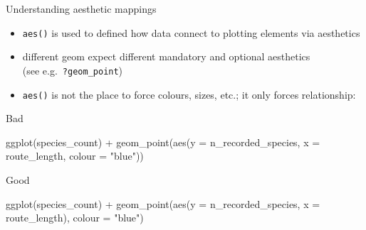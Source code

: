 \documentclass[
  ignorenonframetext,
  aspectratio=169,
]{beamer}
\newenvironment{Shaded}{\begin{snugshade}}{\end{snugshade}}
\newcommand{\AttributeTok}[1]{\textcolor[rgb]{0.40,0.45,0.13}{#1}}
\newcommand{\FunctionTok}[1]{\textcolor[rgb]{0.28,0.35,0.67}{#1}}
\newcommand{\NormalTok}[1]{\textcolor[rgb]{0.00,0.23,0.31}{#1}}
\newcommand{\SpecialCharTok}[1]{\textcolor[rgb]{0.37,0.37,0.37}{#1}}
\newcommand{\StringTok}[1]{\textcolor[rgb]{0.13,0.47,0.30}{#1}}
\providecommand{\tightlist}{%
  \setlength{\itemsep}{0pt}\setlength{\parskip}{0pt}}
\let\oldtexttt\texttt
\renewcommand{\texttt}[1]{\colorbox{gray!20}{\oldtexttt{#1}}}
\begin{document}
\begin{frame}[fragile]{Understanding aesthetic mappings}
\protect{}\label{understanding-aesthetic-mappings}
\begin{itemize}
\tightlist
\item
  \texttt{aes()} is used to defined how data connect to plotting
  elements via aesthetics
\item
  different geom expect different mandatory and optional aesthetics\\
  (see e.g.~\texttt{?geom\_point})
\end{itemize}

\pause

\vspace{0.5em}

\begin{itemize}
\tightlist
\item
  \texttt{aes()} is not the place to force colours, sizes, etc.; it only
  forces relationship:
\end{itemize}

\begin{block}{Bad}
\protect{}\label{bad}
\footnotesize

\begin{Shaded}
\begin{Highlighting}[]
\FunctionTok{ggplot}\NormalTok{(species\_count) }\SpecialCharTok{+}
  \FunctionTok{geom\_point}\NormalTok{(}\FunctionTok{aes}\NormalTok{(}\AttributeTok{y =}\NormalTok{ n\_recorded\_species, }\AttributeTok{x =}\NormalTok{ route\_length, }\AttributeTok{colour =} \StringTok{"blue"}\NormalTok{))}
\end{Highlighting}
\end{Shaded}

\normalsize
\end{block}

\begin{block}{Good}
\protect{}\label{good}
\footnotesize

\begin{Shaded}
\begin{Highlighting}[]
\FunctionTok{ggplot}\NormalTok{(species\_count) }\SpecialCharTok{+}
  \FunctionTok{geom\_point}\NormalTok{(}\FunctionTok{aes}\NormalTok{(}\AttributeTok{y =}\NormalTok{ n\_recorded\_species, }\AttributeTok{x =}\NormalTok{ route\_length), }\AttributeTok{colour =} \StringTok{"blue"}\NormalTok{)}
\end{Highlighting}
\end{Shaded}

\normalsize
\end{block}
\end{frame}
\end{document}
